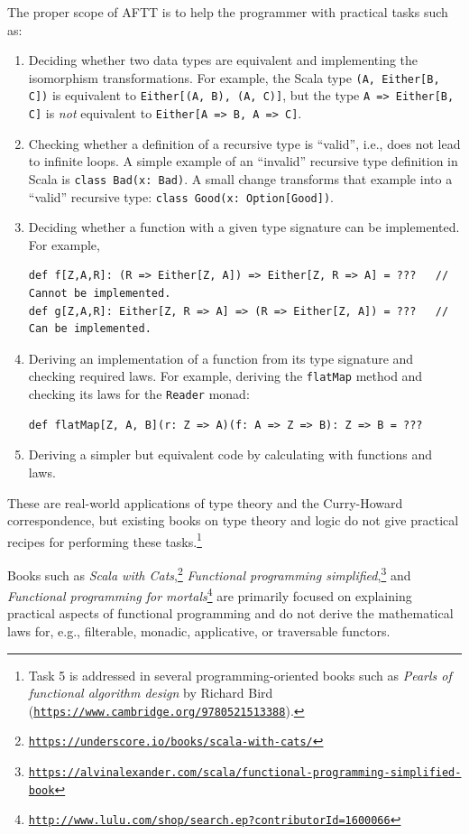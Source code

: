 The proper scope of AFTT is to help the programmer with practical
tasks such as:
\begin{enumerate}
\item Deciding whether two data types are equivalent and implementing the
isomorphism transformations. For example, the Scala type \lstinline!(A, Either[B, C])!
is equivalent to \lstinline!Either[(A, B), (A, C)]!, but the type
\lstinline!A => Either[B, C]! is \emph{not} equivalent to \lstinline!Either[A => B, A => C]!.
\item Checking whether a definition of a recursive type is \textsf{``}valid\textsf{''},
i.e., does not lead to infinite loops. A simple example of an \textsf{``}invalid\textsf{''}
recursive type definition in Scala is \lstinline!class Bad(x: Bad)!.
A small change transforms that example into a \textsf{``}valid\textsf{''} recursive
type: \lstinline!class Good(x: Option[Good])!.
\item Deciding whether a function with a given type signature can be implemented.
For example, 
\begin{lstlisting}
def f[Z,A,R]: (R => Either[Z, A]) => Either[Z, R => A] = ???   // Cannot be implemented.
def g[Z,A,R]: Either[Z, R => A] => (R => Either[Z, A]) = ???   // Can be implemented.
\end{lstlisting}
\item Deriving an implementation of a function from its type signature and
checking required laws. For example, deriving the \lstinline!flatMap!
method and checking its laws for the \lstinline!Reader! monad:
\begin{lstlisting}
def flatMap[Z, A, B](r: Z => A)(f: A => Z => B): Z => B = ???
\end{lstlisting}
\item Deriving a simpler but equivalent code by calculating with functions
and laws.
\end{enumerate}
These are real-world applications of type theory and the Curry-Howard
correspondence, but existing books on type theory and logic do not
give practical recipes for performing these tasks.\footnote{Task 5 is addressed in several programming-oriented books such as
\emph{Pearls of functional algorithm design} by Richard
Bird (\texttt{\href{https://www.cambridge.org/9780521513388}{https://www.cambridge.org/9780521513388}}).}

Books such as \emph{Scala with Cats},\footnote{\texttt{\href{https://underscore.io/books/scala-with-cats/}{https://underscore.io/books/scala-with-cats/}}}
\emph{Functional programming simplified},\footnote{\texttt{\href{https://alvinalexander.com/scala/functional-programming-simplified-book}{https://alvinalexander.com/scala/functional-programming-simplified-book}}}
and \emph{Functional programming for mortals}\footnote{\texttt{\href{http://www.lulu.com/shop/search.ep?contributorId=1600066}{http://www.lulu.com/shop/search.ep?contributorId=1600066}}}
are primarily focused on explaining practical aspects of functional
programming and do not derive the mathematical laws for, e.g., filterable,
monadic, applicative, or traversable functors.

